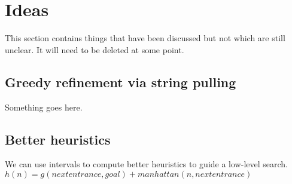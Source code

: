 \section{Ideas}
This section contains things that have been discussed but not which are still unclear. 
It will need to be deleted at some point.

\subsection{Greedy refinement via string pulling}
Something goes here.

\subsection{Better heuristics}
We can use intervals to compute better heuristics to guide a low-level search.
$h(n) = g(nextentrance, goal) + manhattan(n, nextentrance)$

